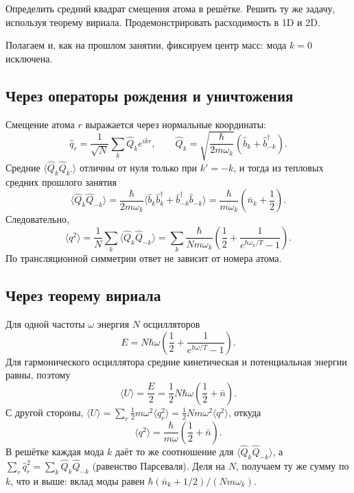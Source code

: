 \documentclass[../final.tex]{subfiles}
\begin{document}
\captionsetup{font=footnotesize,labelfont=bf,skip=5pt}

\begingroup
\renewcommand{\thesection}{4.\arabic{section}}
\label{task:fksv_displacement}

\condition
Определить средний квадрат смещения атома в решётке.
Решить ту же задачу, используя теорему вириала.
Продемонстрировать расходимость в 1D и 2D.

\solution
Полагаем  и, как на прошлом занятии,
фиксируем центр масс: мода $k=0$ исключена.

\subsection*{Через операторы рождения и уничтожения}

Смещение атома $r$ выражается через нормальные координаты:
\[
    \hat q_r=\frac1{\sqrt N}\sum_k\hat Q_ke^{ikr},\qquad
    \hat Q_k=\sqrt{\frac{\hbar}{2m\omega_k}}
       \left(\hat b_k+\hat b_{-k}^\dagger\right).
\]
Средние $\langle\hat Q_k\hat Q_{k'}\rangle$ отличны от нуля только
при $k'=-k$, и тогда из тепловых средних прошлого занятия
\[
    \langle\hat Q_k\hat Q_{-k}\rangle
       =\frac{\hbar}{2m\omega_k}
        \langle\hat b_k\hat b_k^\dagger+\hat b_{-k}^\dagger\hat b_{-k}\rangle
       =\frac{\hbar}{m\omega_k}\left(\bar n_k+\frac12\right).
\]
Следовательно,
\[
    \langle q^2\rangle=\frac1N\sum_k\langle\hat Q_k\hat Q_{-k}\rangle
       =\sum_k\frac{\hbar}{Nm\omega_k}
         \left(\frac12+\frac1{e^{\hbar\omega_k/T}-1}\right).
\]
По трансляционной симметрии ответ не зависит от номера атома.

\subsection*{Через теорему вириала}

Для одной частоты $\omega$ энергия $N$ осцилляторов
\[
    E=N\hbar\omega\left(\frac12+\frac1{e^{\hbar\omega/T}-1}\right).
\]
Для гармонического осциллятора средние кинетическая и потенциальная
энергии равны, поэтому
\[
    \langle U\rangle=\frac E2
       =\frac12N\hbar\omega\left(\frac12+\bar n\right).
\]
С другой стороны,
$\langle U\rangle=\sum_r\frac12m\omega^2\langle q_r^2\rangle
=\frac12Nm\omega^2\langle q^2\rangle$, откуда
\[
    \langle q^2\rangle=\frac{\hbar}{m\omega}\left(\frac12+\bar n\right).
\]
В решётке каждая мода $k$ даёт то же соотношение для
$\langle\hat Q_k\hat Q_{-k}\rangle$, а
$\sum_r\hat q_r^2=\sum_k\hat Q_k\hat Q_{-k}$ (равенство Парсеваля).
Деля на $N$, получаем ту же сумму по $k$, что и выше:
вклад моды равен $\hbar(\bar n_k+1/2)/(Nm\omega_k)$.
\end{document}
